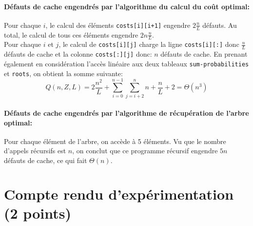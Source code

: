 \documentclass[a4paper, 10pt, french]{article}
\begin{document}
    \paragraph{Défauts de cache engendrés par l'algorithme du calcul du coût optimal: \\ }
    {Pour chaque $i$, le calcul des éléments \texttt{costs[i][i+1]} engendre $2\frac{n}{L}$ défauts. Au total, le calcul de tous ces éléments
    engendre $2n\frac{n}{L}$.\\
    Pour chaque $i$ et $j$, le calcul de \texttt{costs[i][j]} charge la ligne \texttt{costs[i][:]} donc $\frac{n}{L}$ défauts de cache et la colonne \texttt{costs[:][j]}
    donc: $n$ défauts de cache. En prenant également en considération l'accès linéaire aux deux tableaux \texttt{sum-probabilities} et \texttt{roots}, on obtient la somme suivante:
    $$ Q(n,Z,L) = 2\frac{n^2}{L}+\sum_{i=0}^{n-1}\sum_{j=i+2}^{n}n+\frac{n}{L}+2 = \Theta(n^3)$$
    }
    \paragraph{Défauts de cache engendrés par l'algorithme de récupération de l'arbre optimal: \\ }
    {
    Pour chaque élément de l'arbre, on accède à 5 éléments. Vu que le nombre d'appels récursifs est $n$, on conclut que
    ce programme récursif engendre $5n$ défauts de cache, ce qui fait $\Theta(n)$.
    }




\section{Compte rendu d'expérimentation (2 points)}
\end{document}
